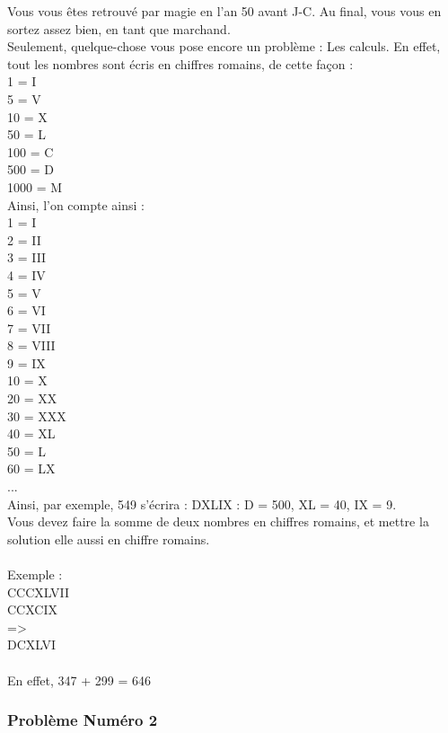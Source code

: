 \documentclass[12pt]{article}
\begin{document}
Vous vous êtes retrouvé par magie en l'an 50 avant J-C. Au final, vous vous en sortez assez bien, en tant que marchand.\\
Seulement, quelque-chose vous pose encore un problème : Les calculs. En effet, tout les nombres sont écris en chiffres romains, de cette façon :\\
1 = I\\
5 = V\\
10 = X\\
50 = L\\
100 = C\\
500 = D\\
1000 = M\\
Ainsi, l'on compte ainsi :\\
1 = I\\
2 = II\\
3 = III\\
4 = IV\\
5 = V\\
6 = VI\\
7 = VII\\
8 = VIII\\
9 = IX\\
10 = X\\
20 = XX\\
30 = XXX\\
40 = XL\\
50 = L\\
60 = LX\\
...\\
Ainsi, par exemple, 549 s'écrira : DXLIX : D = 500, XL = 40, IX = 9.\\
Vous devez faire la somme de deux nombres en chiffres romains, et mettre la solution elle aussi en chiffre romains.
\\\\
Exemple :\\
CCCXLVII\\
CCXCIX\\
=\textgreater\\
DCXLVI
\\\\
En effet, 347 + 299 = 646

\subsubsection{Problème Numéro 2}
\end{document}
